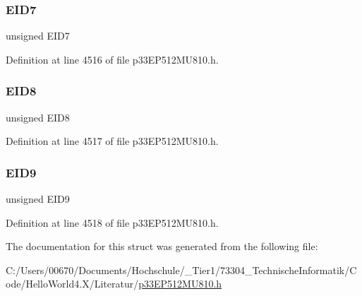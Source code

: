 \subsubsection{\texorpdfstring{E\+I\+D7}{EID7}}
{\footnotesize\ttfamily unsigned E\+I\+D7}



Definition at line 4516 of file p33\+E\+P512\+M\+U810.\+h.

\mbox{\label{structtag_c1_r_x_f13_e_i_d_b_i_t_s_acca25e0b7d86eb499d01f85222baea87}} 
\subsubsection{\texorpdfstring{E\+I\+D8}{EID8}}
{\footnotesize\ttfamily unsigned E\+I\+D8}



Definition at line 4517 of file p33\+E\+P512\+M\+U810.\+h.

\mbox{\label{structtag_c1_r_x_f13_e_i_d_b_i_t_s_ac6748f73d4ada8538b06548be4f396c2}} 
\subsubsection{\texorpdfstring{E\+I\+D9}{EID9}}
{\footnotesize\ttfamily unsigned E\+I\+D9}



Definition at line 4518 of file p33\+E\+P512\+M\+U810.\+h.



The documentation for this struct was generated from the following file\+:\begin{DoxyCompactItemize}
\item 
C\+:/\+Users/00670/\+Documents/\+Hochschule/\+\_\+\+Tier1/73304\+\_\+\+Technische\+Informatik/\+Code/\+Hello\+World4.\+X/\+Literatur/\hyperlink{p33_e_p512_m_u810_8h}{p33\+E\+P512\+M\+U810.\+h}\end{DoxyCompactItemize}
